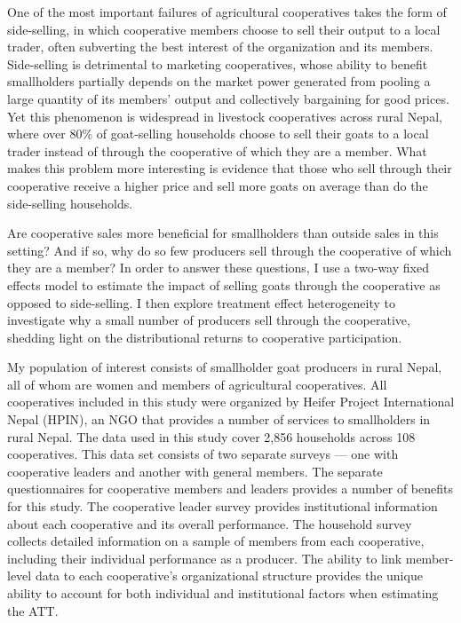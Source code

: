 \documentclass[11pt]{article}
\begin{document}
One of the most important failures of agricultural cooperatives takes the form of side-selling, in which cooperative members choose to sell their output to a local trader, often subverting the best interest of the organization and its members. Side-selling is detrimental to marketing cooperatives, whose ability to benefit smallholders partially depends on the market power generated from pooling a large quantity of its members' output and collectively bargaining for good prices. Yet this phenomenon is widespread in livestock cooperatives across rural Nepal, where over 80\% of goat-selling households choose to sell their goats to a local trader instead of through the cooperative of which they are a member. What makes this problem more interesting is evidence that those who sell through their cooperative receive a higher price and sell more goats on average than do the side-selling households. 

Are cooperative sales more beneficial for smallholders than outside sales in this setting? And if so, why do so few producers sell through the cooperative of which they are a member? In order to answer these questions, I use a two-way fixed effects model to estimate the impact of selling goats through the cooperative as opposed to side-selling. I then explore treatment effect heterogeneity to investigate why a small number of producers sell through the cooperative, shedding light on the distributional returns to cooperative participation. 

My population of interest consists of smallholder goat producers in rural Nepal, all of whom are women and members of agricultural cooperatives. All cooperatives included in this study were organized by Heifer Project International Nepal (HPIN), an NGO that provides a number of services to smallholders in rural Nepal. The data used in this study cover 2,856 households across 108 cooperatives. This data set consists of two separate surveys --- one with cooperative leaders and another with general members. The separate questionnaires for cooperative members and leaders provides a number of benefits for this study. The cooperative leader survey provides institutional information about each cooperative and its overall performance. The household survey collects detailed information on a sample of members from each cooperative, including their individual performance as a producer. The ability to link member-level data to each cooperative's organizational structure provides the unique ability to account for both individual and institutional factors when estimating the ATT. %
\end{document}
